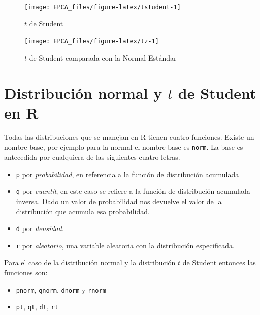 \documentclass[letterpaper,]{book}
\providecommand{\tightlist}{%
  \setlength{\itemsep}{0pt}\setlength{\parskip}{0pt}}
\begin{document}
\begin{figure}[h!]

{\centering \texttt{[image: EPCA\_files/figure-latex/tstudent-1]} 

}

\caption{$t$ de Student}\label{fig:tstudent}
\end{figure}

\begin{figure}[h!]

{\centering \texttt{[image: EPCA\_files/figure-latex/tz-1]} 

}

\caption{$t$ de Student comparada con la Normal Estándar}\label{fig:tz}
\end{figure}

\hypertarget{distribucion-normal-y-t-de-student-en-r}{%
\section{\texorpdfstring{Distribución normal y \(t\) de Student en R}{Distribución normal y t de Student en R}}\label{distribucion-normal-y-t-de-student-en-r}}

Todas las distribuciones que se manejan en R tienen cuatro funciones. Existe un nombre base, por ejemplo para la normal el nombre base es \texttt{norm}. La base es antecedida por cualquiera de las siguientes cuatro letras.

\begin{itemize}
\tightlist
\item
  \texttt{p} por \emph{probabilidad}, en referencia a la función de distribución acumulada
\item
  \texttt{q} por \emph{cuantil}, en este caso se refiere a la función de distribución acumulada inversa. Dado un valor de probabilidad nos devuelve el valor de la distribución que acumula esa probabilidad.
\item
  \texttt{d} por \emph{densidad}.
\item
  \texttt{r} por \emph{aleatorio}, una variable aleatoria con la distribución especificada.
\end{itemize}

Para el caso de la distribución normal y la distribución \(t\) de Student entonces las funciones son:

\begin{itemize}
\tightlist
\item
  \texttt{pnorm}, \texttt{qnorm}, \texttt{dnorm} y \texttt{rnorm}
\item
  \texttt{pt}, \texttt{qt}, \texttt{dt}, \texttt{rt}
\end{itemize}
\end{document}
